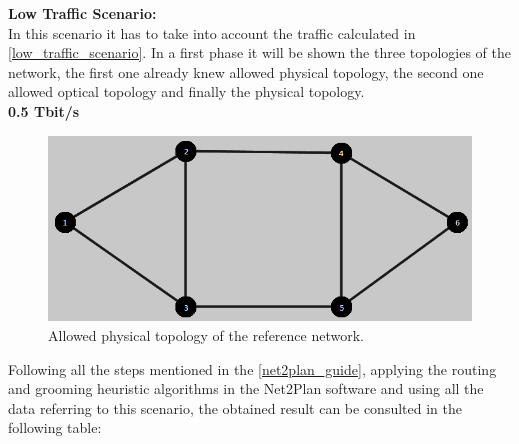 \textbf{Low Traffic Scenario:}\\

In this scenario it has to take into account the traffic calculated in \ref{low_traffic_scenario}. In a first phase it will be shown the three topologies of the network, the first one already knew allowed physical topology, the second one allowed optical topology and finally the physical topology.\\

\textbf{0.5 Tbit/s}

\begin{figure}[H]
\centering
\includegraphics[width=13cm]{sdf/heuristic/figures/topological_design1}
\caption{Allowed physical topology of the reference network.}
\label{allowed_physical_surv_ref_low_heuristic}
\end{figure}

Following all the steps mentioned in the \ref{net2plan_guide}, applying the routing and grooming heuristic algorithms in the Net2Plan software and using all the data referring to this scenario, the obtained result can be consulted in the following table:

